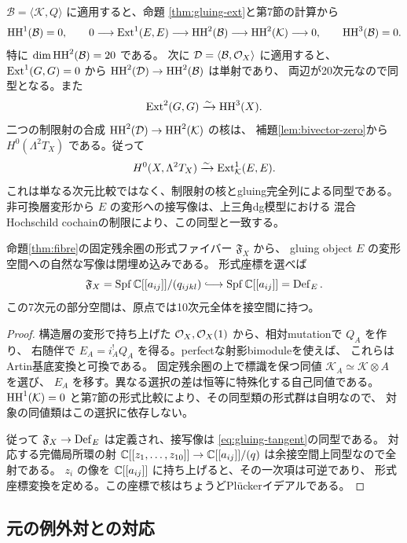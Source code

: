 $\mathcal B=\langle\mathcal K,Q\rangle$ に適用すると、命題
\ref{thm:gluing-ext}と第7節の計算から
\[
 \operatorname{HH}^1(\mathcal B)=0,\qquad
 0\longrightarrow\operatorname{Ext}^1(E,E)\longrightarrow\operatorname{HH}^2(\mathcal B)
 \longrightarrow\operatorname{HH}^2(\mathcal K)\longrightarrow0,\qquad
 \operatorname{HH}^3(\mathcal B)=0.
\]
特に $\dim\operatorname{HH}^2(\mathcal B)=20$ である。
次に $\mathcal D=\langle\mathcal B,\mathcal O_X\rangle$ に適用すると、
$\operatorname{Ext}^1(G,G)=0$ から
$\operatorname{HH}^2(\mathcal D)\to\operatorname{HH}^2(\mathcal B)$ は単射であり、
両辺が20次元なので同型となる。また
\[
 \operatorname{Ext}^2(G,G)\xrightarrow{\sim}\operatorname{HH}^3(X).
\]
二つの制限射の合成 $\operatorname{HH}^2(\mathcal D)\to\operatorname{HH}^2(\mathcal K)$ の核は、
補題\ref{lem:bivector-zero}から $H^0(\Lambda^2T_X)$ である。従って
\begin{equation}\label{eq:gluing-tangent}
 H^0(X,\Lambda^2T_X)\xrightarrow{\sim}
 \operatorname{Ext}^1_{\mathcal K}(E,E).
\end{equation}
これは単なる次元比較ではなく、制限射の核とgluing完全列による同型である。
非可換層変形から $E$ の変形への接写像は、上三角dg模型における
混合Hochschild cochainの制限により、この同型と一致する。

\begin{theorem}[滑らかな対象変形空間内の錐]\label{thm:object-cone}
命題\ref{thm:fibre}の固定残余圏の形式ファイバー $\mathfrak F_X$ から、
gluing object $E$ の変形空間への自然な写像は閉埋め込みである。
形式座標を選べば
\[
 \mathfrak F_X=
 \Spf\CC[[a_{ij}]]/(q_{ijkl})
 \lhook\joinrel\longrightarrow
 \Spf\CC[[a_{ij}]]=\Def_E.
\]
この7次元の部分空間は、原点では10次元全体を接空間に持つ。
\end{theorem}

\begin{proof}
構造層の変形で持ち上げた $\mathcal O_X,\mathcal O_X(1)$ から、相対mutationで $Q_A$ を作り、
右随伴で $E_A=i_A^!Q_A$ を得る。perfectな射影bimoduleを使えば、
これらはArtin基底変換と可換である。
固定残余圏の上で標識を保つ同値 $\mathcal K_A\simeq\mathcal K\otimes A$ を選び、
$E_A$ を移す。異なる選択の差は恒等に特殊化する自己同値である。
$\operatorname{HH}^1(\mathcal K)=0$ と第7節の形式比較により、その同型類の形式群は自明なので、
対象の同値類はこの選択に依存しない。

従って $\mathfrak F_X\to\operatorname{Def}_E$ は定義され、接写像は
\eqref{eq:gluing-tangent}の同型である。
対応する完備局所環の射
$\mathbb C[[z_1,\ldots,z_{10}]]\to\mathbb C[[a_{ij}]]/(q)$
は余接空間上同型なので全射である。
$z_i$ の像を $\mathbb C[[a_{ij}]]$ に持ち上げると、その一次項は可逆であり、
形式座標変換を定める。この座標で核はちょうどPlückerイデアルである。
\end{proof}

\subsection{元の例外対との対応}

